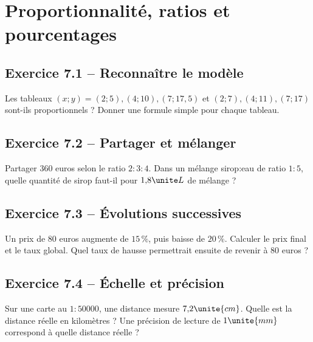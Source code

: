 \chapter{Proportionnalité, ratios et pourcentages}
\label{exercices:07}
\section*{Exercice 7.1 -- Reconnaître le modèle}
Les tableaux $(x;y)=(2;5),(4;10),(7;17{,}5)$ et $(2;7),(4;11),(7;17)$ sont-ils proportionnels ? Donner une formule simple pour chaque tableau.

\section*{Exercice 7.2 -- Partager et mélanger}
Partager $360$ euros selon le ratio $2:3:4$. Dans un mélange sirop:eau de ratio $1:5$, quelle quantité de sirop faut-il pour $1{,}8\unite L$ de mélange ?

\section*{Exercice 7.3 -- Évolutions successives}
Un prix de $80$ euros augmente de $15\,\%$, puis baisse de $20\,\%$. Calculer le prix final et le taux global. Quel taux de hausse permettrait ensuite de revenir à $80$ euros ?

\section*{Exercice 7.4 -- Échelle et précision}
Sur une carte au $1:50000$, une distance mesure $7{,}2\unite{cm}$. Quelle est la distance réelle en kilomètres ? Une précision de lecture de $1\unite{mm}$ correspond à quelle distance réelle ?
